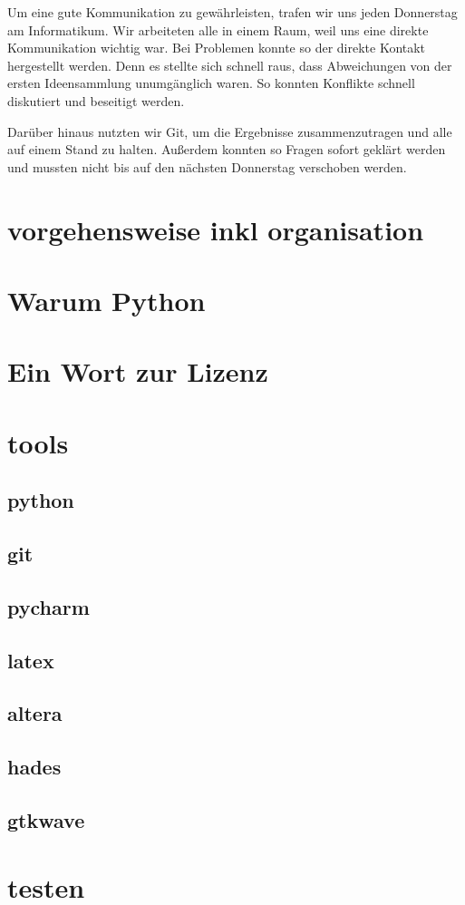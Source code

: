 Um eine gute Kommunikation zu gewährleisten, trafen wir uns jeden Donnerstag am Informatikum. Wir arbeiteten alle in einem Raum, weil uns eine direkte Kommunikation wichtig war. Bei Problemen konnte so der direkte Kontakt hergestellt werden. Denn es stellte sich schnell raus, dass Abweichungen von der ersten Ideensammlung unumgänglich waren. So konnten Konflikte schnell diskutiert und beseitigt werden.

Darüber hinaus nutzten wir Git, um die Ergebnisse zusammenzutragen und alle auf einem Stand zu halten. Außerdem konnten so Fragen sofort geklärt werden und mussten nicht bis auf den nächsten Donnerstag verschoben werden.

\section{vorgehensweise inkl organisation}
\section{Warum Python} %

\section{Ein Wort zur Lizenz} %

\section{tools}
\subsection{python}
\subsection{git}
\subsection{pycharm}
\subsection{latex}
\subsection{altera}
\subsection{hades}
\subsection{gtkwave}
\section{testen}
